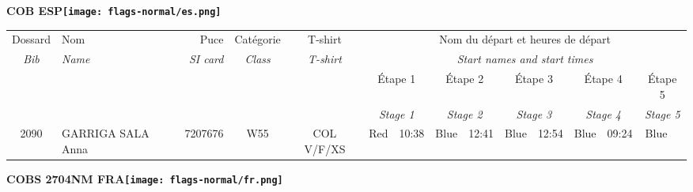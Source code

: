 \documentclass{report}
\begin{document}
\newpage
  \Huge \centering \bfseries COB  ESP\normalfont \footnotesize \sffamily \hfill \texttt{[image: flags-normal/es.png]} \newline 
  \begin{longtable}{|c|l|r|c|c|*{5}{cc|}}
    Dossard & Nom  & Puce    & Catégorie & T-shirt & \multicolumn{10}{c|}{Nom du départ et heures de départ} \\
    \itshape Bib     & \itshape Name & \itshape SI card & \itshape Class  & \itshape  T-shirt  & \multicolumn{10}{c|}{\itshape Start names and start times} \\
    \hline
    & & & & & \multicolumn{2}{c|}{Étape 1} & \multicolumn{2}{c|}{Étape 2} & \multicolumn{2}{c|}{Étape 3} & \multicolumn{2}{c|}{Étape 4} & \multicolumn{2}{c|}{Étape 5} \\
    & & & & & \multicolumn{2}{c|}{\itshape Stage 1} & \multicolumn{2}{c|}{\itshape Stage 2} & \multicolumn{2}{c|}{\itshape Stage 3} & \multicolumn{2}{c|}{\itshape Stage 4} & \multicolumn{2}{c|}{\itshape Stage 5} \\
    \hline
    2090 & GARRIGA SALA Anna & 7207676 & W55 & COL V/F/XS & Red & 10:38 & Blue & 12:41 & Blue & 12:54 & Blue & 09:24 & Blue &  \\
  \end{longtable}
\newpage
  \Huge \centering \bfseries COBS 2704NM FRA\normalfont \footnotesize \sffamily \hfill \texttt{[image: flags-normal/fr.png]} \newline 
\end{document}
